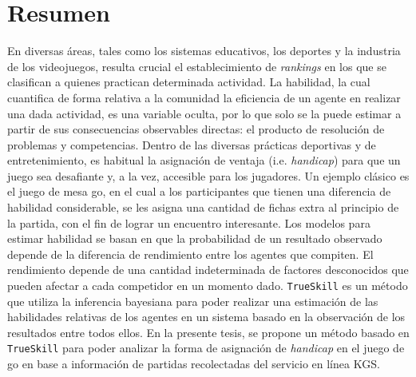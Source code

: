 \documentclass[11pt,twoside,spanish]{report} %
\begin{document}
\chapter*{Resumen}
\pagestyle{empty}
\thispagestyle{empty}



En diversas \'areas, tales como los sistemas educativos, los deportes y la industria de los videojuegos, resulta crucial el establecimiento de \emph{rankings} en los que se clasifican a quienes practican determinada actividad.
La habilidad, la cual cuantifica de forma relativa a la comunidad la eficiencia de un agente en realizar una dada actividad, es una variable oculta, por lo que solo se la puede estimar a partir de sus consecuencias observables directas: el producto de resoluci\'on de problemas y competencias.
Dentro de las diversas pr\'acticas deportivas y de entretenimiento, es habitual la asignaci\'on de ventaja (i.e. \emph{handicap}) para que un juego sea desafiante y, a la vez, accesible para los jugadores.
Un ejemplo cl\'asico es el juego de mesa go, en el cual a los participantes que tienen una diferencia de habilidad considerable, se les asigna una cantidad de fichas extra al principio de la partida, con el fin de lograr un encuentro interesante.
%
Los modelos para estimar habilidad se basan en que la probabilidad de un resultado observado depende de la diferencia de rendimiento entre los agentes que compiten.
El rendimiento depende de una cantidad indeterminada de factores desconocidos que pueden afectar a cada competidor en un momento dado.
\texttt{TrueSkill} es un m\'etodo que utiliza la inferencia bayesiana para poder realizar una estimaci\'on de las habilidades relativas de los agentes en un sistema basado en la observaci\'on de los resultados entre todos ellos.
En la presente tesis, se propone un m\'etodo basado en \texttt{TrueSkill} para poder analizar la forma de asignaci\'on de \emph{handicap} en el juego de go en base a informaci\'on de partidas recolectadas del servicio en l\'inea KGS.
\end{document}
